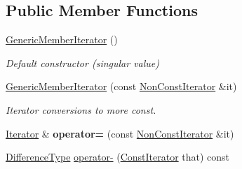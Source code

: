 \subsection*{Public Member Functions}
\begin{DoxyCompactItemize}
\item 
\hyperlink{class_generic_member_iterator_ad0db649cdfd28d943e16e6c848613cfc}{Generic\+Member\+Iterator} ()
\begin{DoxyCompactList}\small\item\em Default constructor (singular value) \end{DoxyCompactList}\item 
\hyperlink{class_generic_member_iterator_a2697fd327a90654b0bf91c988e43f95e}{Generic\+Member\+Iterator} (const \hyperlink{class_generic_member_iterator_abc26eb06f2962765b11dcd06ce84ac02}{Non\+Const\+Iterator} \&it)
\begin{DoxyCompactList}\small\item\em Iterator conversions to more const. \end{DoxyCompactList}\item 
\hyperlink{class_generic_member_iterator_ad1cf1ecf6210b47906c9f179c893a8b8}{Iterator} \& {\bfseries operator=} (const \hyperlink{class_generic_member_iterator_abc26eb06f2962765b11dcd06ce84ac02}{Non\+Const\+Iterator} \&it)\hypertarget{class_generic_member_iterator_a4ebb2b80e7d70c11802520ae77958df3}{}\label{class_generic_member_iterator_a4ebb2b80e7d70c11802520ae77958df3}

\item 
\hyperlink{class_generic_member_iterator_a902b99c8ae351cd7626514dc5f30740a}{Difference\+Type} \hyperlink{class_generic_member_iterator_a056851821e75c4be13b297604bc37c0b}{operator-\/} (\hyperlink{class_generic_member_iterator_ae5be27a73dce0be58ee2776db896d591}{Const\+Iterator} that) const \hypertarget{class_generic_member_iterator_a056851821e75c4be13b297604bc37c0b}{}\label{class_generic_member_iterator_a056851821e75c4be13b297604bc37c0b}


\end{DoxyCompactItemize}
